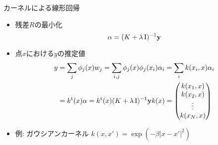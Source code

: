 \begin{frame}[t,fragile]{カーネルによる線形回帰}
  \begin{itemize}
  \item 残差$R$の最小化
    \[
    \alpha = (K + \lambda \, {\rm I})^{-1} {\bf y}
    \]
  \item 点$x$における$y$の推定値
    \begin{align*}
    y &= \sum_j \phi_j(x) w_j = \sum_{i,j} \phi_j(x) \phi_j(x_i) \alpha_i = \sum_i k(x_i,x) \alpha_i \\ &= k^{\rm t}(x) \alpha = k^{\rm t}(x) (K + \lambda \, {\rm I})^{-1} {\bf y}
k(x) = \begin{pmatrix} k(x_1,x) \\ k(x_2,x) \\ \vdots \\ k(x_N,x) \end{pmatrix}
    \end{align*}
  \item 例: ガウシアンカーネル $k(x,x') = \exp(-\beta|x-x'|^2)$
  \end{itemize}
\end{frame}
